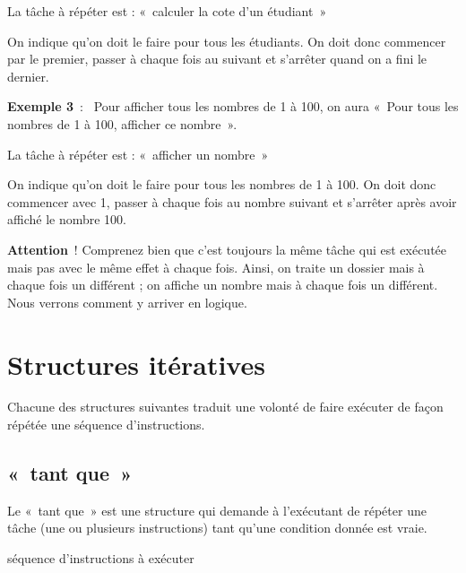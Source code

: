 	\begin{liste}
	\item 
		La tâche à répéter est : «~calculer la cote d’un étudiant~»
	\item 
		On indique qu’on doit le faire pour tous les étudiants.
		On doit donc commencer par le premier, passer à chaque fois au suivant
		et s’arrêter quand on a fini le dernier.
	\end{liste}

	\textbf{Exemple 3}~:~
	Pour afficher tous les nombres de 1 à 100, on aura
	«~Pour tous les nombres de 1 à 100, afficher ce nombre~».

	\begin{liste}
	\item
		La tâche à répéter est : «~afficher un nombre~»
	\item 
		On indique qu’on doit le faire pour tous les nombres de 1 à 100. 
		On doit donc commencer avec 1, 
		passer à chaque fois au nombre suivant 
		et s’arrêter après avoir affiché le nombre 100.
	\end{liste}

	\textbf{Attention}~! 
	Comprenez bien que c’est toujours la même tâche qui est exécutée 
	mais pas avec le même effet à chaque fois. 
	Ainsi, on traite un dossier mais à chaque fois un différent ; 
	on affiche un nombre mais à chaque fois un différent. 
	Nous verrons comment y arriver en logique.

\section{Structures itératives}

	Chacune des structures suivantes traduit une volonté de faire exécuter
	de façon répétée une séquence d’instructions. 

	\subsection{«~tant que~»}

		Le «~tant que~» est une structure qui demande à
		l’exécutant de répéter une tâche (une ou plusieurs
		instructions) tant qu’une condition donnée est vraie.

		\begin{Pseudocode}
			\Stmt séquence d’instructions à exécuter
		\EndWhile
		\end{Pseudocode}


